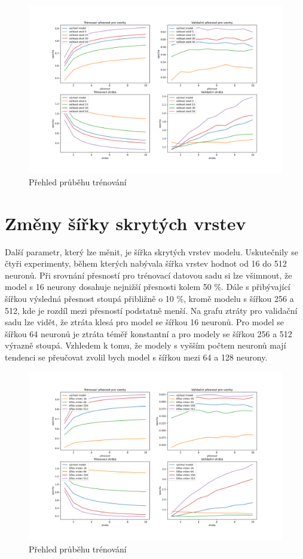 \documentclass[FM,BP]{tulthesis}
\begin{document}
\begin{figure}[!htbp]
\centerline{\includegraphics[scale=.5]{training_course-margin.png}}
\caption{Přehled průběhu trénování}
\label{fig}
\end{figure}
\FloatBarrier

\section{Změny šířky skrytých vrstev} %
Další parametr, který lze měnit, je šířka skrytých vrstev modelu. Uskutečnily se čtyři experimenty, během kterých nabývala šířka vrstev hodnot od 16 do 512 neuronů. Při srovnání přesností pro trénovací datovou sadu si lze všimnout, že model s 16 neurony dosahuje nejnižší přesnosti kolem 50 \%. Dále s přibývající šířkou výsledná přesnost stoupá přibližně o 10 \%, kromě modelu s šířkou 256 a 512, kde je rozdíl mezi přesností podstatně menší. Na grafu ztráty pro validační sadu lze vidět, že ztráta klesá pro model se šířkou 16 neuronů. Pro model se šířkou 64 neuronů je ztráta téměř konstantní a pro modely se šířkou 256 a 512 výrazně stoupá. Vzhledem k tomu, že modely s vyšším počtem neuronů mají tendenci se přeučovat zvolil bych model s šířkou mezi 64 a 128 neurony.

\begin{figure}[!htbp]
\centerline{\includegraphics[scale=.5]{training_course-width.png}}
\caption{Přehled průběhu trénování}
\label{fig}
\end{figure}
\FloatBarrier
\end{document}
